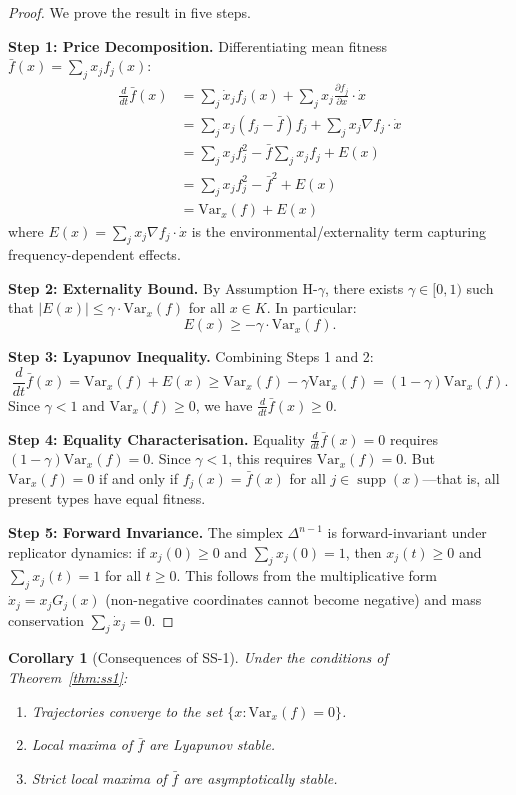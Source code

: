 \documentclass[12pt]{article}
\newtheorem{corollary}[theorem]{Corollary}
\newcommand{\Var}{\mathrm{Var}}
\DeclareMathOperator{\supp}{supp}
\begin{document}
\begin{proof}
We prove the result in five steps.

\textbf{Step 1: Price Decomposition.}
Differentiating mean fitness $\bar{f}(x) = \sum_j x_j f_j(x)$:
\begin{align*}
\frac{d}{dt} \bar{f}(x) &= \sum_j \dot{x}_j f_j(x) + \sum_j x_j \frac{\partial f_j}{\partial x} \cdot \dot{x} \\
&= \sum_j x_j(f_j - \bar{f}) f_j + \sum_j x_j \nabla f_j \cdot \dot{x} \\
&= \sum_j x_j f_j^2 - \bar{f} \sum_j x_j f_j + E(x) \\
&= \sum_j x_j f_j^2 - \bar{f}^2 + E(x) \\
&= \Var_x(f) + E(x)
\end{align*}
where $E(x) = \sum_j x_j \nabla f_j \cdot \dot{x}$ is the environmental/externality term capturing frequency-dependent effects.

\textbf{Step 2: Externality Bound.}
By Assumption H-$\gamma$, there exists $\gamma \in [0,1)$ such that $|E(x)| \leq \gamma \cdot \Var_x(f)$ for all $x \in K$. In particular:
\[
E(x) \geq -\gamma \cdot \Var_x(f).
\]

\textbf{Step 3: Lyapunov Inequality.}
Combining Steps 1 and 2:
\[
\frac{d}{dt} \bar{f}(x) = \Var_x(f) + E(x) \geq \Var_x(f) - \gamma \Var_x(f) = (1 - \gamma) \Var_x(f).
\]
Since $\gamma < 1$ and $\Var_x(f) \geq 0$, we have $\frac{d}{dt} \bar{f}(x) \geq 0$.

\textbf{Step 4: Equality Characterisation.}
Equality $\frac{d}{dt} \bar{f}(x) = 0$ requires $(1 - \gamma) \Var_x(f) = 0$. Since $\gamma < 1$, this requires $\Var_x(f) = 0$. But $\Var_x(f) = 0$ if and only if $f_j(x) = \bar{f}(x)$ for all $j \in \supp(x)$---that is, all present types have equal fitness.

\textbf{Step 5: Forward Invariance.}
The simplex $\Delta^{n-1}$ is forward-invariant under replicator dynamics: if $x_j(0) \geq 0$ and $\sum_j x_j(0) = 1$, then $x_j(t) \geq 0$ and $\sum_j x_j(t) = 1$ for all $t \geq 0$. This follows from the multiplicative form $\dot{x}_j = x_j G_j(x)$ (non-negative coordinates cannot become negative) and mass conservation $\sum_j \dot{x}_j = 0$.
\end{proof}

\begin{corollary}[Consequences of SS-1]
\label{cor:ss1}
Under the conditions of Theorem~\ref{thm:ss1}:
\begin{enumerate}
    \item Trajectories converge to the set $\{x : \Var_x(f) = 0\}$.
    \item Local maxima of $\bar{f}$ are Lyapunov stable.
    \item Strict local maxima of $\bar{f}$ are asymptotically stable.
\end{enumerate}
\end{corollary}
\end{document}
